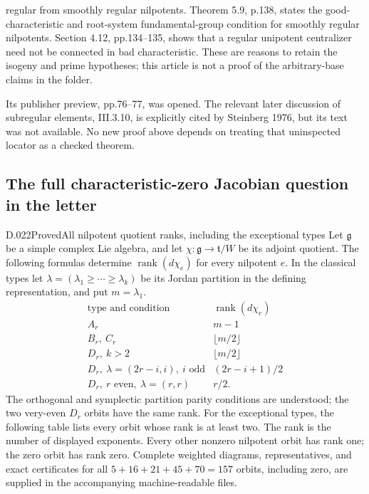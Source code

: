 \begin{description}
regular from smoothly regular nilpotents.  Theorem 5.9,
p.138, states the good-characteristic and root-system
fundamental-group condition for smoothly regular
nilpotents.  Section 4.12, pp.134--135, shows that a
regular unipotent centralizer need not be connected in
bad characteristic.  These are reasons to retain the
isogeny and prime hypotheses; this article is not a
proof of the arbitrary-base claims in the folder.
\item[Steinberg LNM 366.] Its publisher preview,
pp.76--77, was opened.  The relevant later discussion
of subregular elements, III.3.10, is explicitly cited by
Steinberg 1976, but its text was not available.  No new
proof above depends on treating that uninspected
locator as a checked theorem.
\end{description}

\subsection{The full characteristic-zero Jacobian question in the letter}

\begin{saresult}{D.022}{Proved}{All nilpotent quotient ranks, including the exceptional types}
Let $\mathfrak g$ be a simple complex Lie algebra, and let
$\chi:\mathfrak g\longrightarrow\mathfrak t/W$ be its adjoint quotient.
The following formulas determine $\operatorname{rank}(d\chi_e)$ for every
nilpotent $e$.  In the classical types let
$\lambda=(\lambda_1\ge\cdots\ge\lambda_k)$ be its Jordan partition in
the defining representation, and put $m=\lambda_1$.
\[
\begin{array}{c|c}
\text{type and condition}&\operatorname{rank}(d\chi_e)\\\hline
 A_r&m-1\\
 B_r,\ C_r&\lfloor m/2\rfloor\\
 D_r,\ k>2&\lfloor m/2\rfloor\\
 D_r,\ \lambda=(2r-i,i),\ i\text{ odd}&(2r-i+1)/2\\
 D_r,\ r\text{ even},\ \lambda=(r,r)&r/2.
\end{array}                                                     \tag{D22.1}
\]
The orthogonal and symplectic partition parity conditions are understood;
the two very-even $D_r$ orbits have the same rank.
For the exceptional types, the following table lists every orbit whose
rank is at least two.  The rank is the number of displayed exponents.
Every other nonzero nilpotent orbit has rank one; the zero orbit has
rank zero.  Complete weighted diagrams, representatives, and exact
certificates for all $5+16+21+45+70=157$ orbits, including zero,
are supplied in the accompanying machine-readable files.
\end{saresult}

